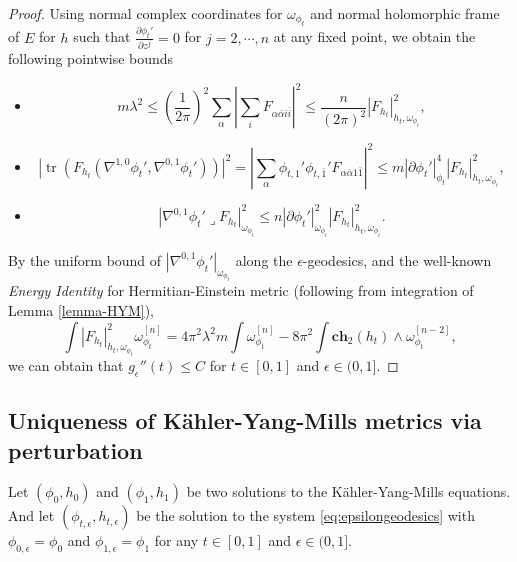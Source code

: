 \documentclass[10pt, letterpaper]{amsart}
\newcommand{\tr}{\operatorname{tr}}
\theoremstyle{plain}
\theoremstyle{definition}
\numberwithin{equation}{section}
\begin{document}
\begin{proof}
	Using normal complex coordinates for $\omega_{\phi_t}$ and normal holomorphic frame of $E$ for $h$ such that $\frac{\partial \phi_t'}{\partial z^j}=0$ for $j=2,\cdots, n$ at any fixed point, we obtain the following pointwise bounds
	\begin{itemize} 
	\item 
		\[
	m\lambda^2 
	\leq 
	\left( \frac{1}{2\pi} \right)^2\sum_\alpha \left|\sum_i F_{\alpha\bar \alpha i\bar i}\right|^2
	\leq 
	\frac{n}{\left(2\pi\right)^2}\left|F_{h_t}\right|_{h_t,\omega_{\phi_t}}^2, 
	\]
	\item 
	\[
	\left| \tr\left(
	F_{h_t}\left(\nabla^{1,0}\phi_t',\nabla^{0,1}\phi_t'\right)
	\right) \right|^2
	= 
	\left|\sum_\alpha \phi_{t,1}'\phi_{t,\bar 1}'F_{\alpha\bar\alpha 1\bar 1}\right|^2 
	\leq 
	m \left|\partial\phi_t'\right|_{\phi_t}^4\left|F_{h_t}\right|_{h_t,\omega_{\phi_t}}^2,
	\]
	\item 
	\[
	\left|\nabla^{0,1}\phi_t'\lrcorner  F_{h_t}\right|_{\omega_{\phi_t}}^2
	\leq 
	n\left|\partial\phi_t'\right|_{\omega_{\phi_t}}^2\left|F_{h_t}\right|_{h_t,\omega_{\phi_t}}^2. 
	\]
	\end{itemize}
By the uniform bound of $\left|\nabla^{0,1}\phi_t'\right|_{\omega_{\phi_t}}$ along the $\epsilon$-geodesics, and the well-known  \emph{Energy Identity} for Hermitian-Einstein metric (following from integration of Lemma \ref{lemma-HYM}), 
\begin{equation}
\int \left|F_{h_t}\right|^2_{h_t,\omega_{\phi_t}} \omega_{\phi_t}^{[n]}
= 
4\pi^2\lambda^2m \int\omega_{\phi_t}^{[n]}
- 
8\pi^2 \int \mathbf{ch}_2\left(h_t\right)\wedge \omega_{\phi_t}^{[n-2]}, 
\end{equation}
we can obtain that $g_\epsilon''(t)\leq C$ for $t\in [0,1]$ and $\epsilon\in (0,1]$. 	
\end{proof}

\subsection{Uniqueness of K\"ahler-Yang-Mills metrics via perturbation}

Let $\left(\phi_0,h_0\right)$ and $\left(\phi_1, h_1\right)$ be two solutions to the K\"ahler-Yang-Mills equations. And let $\left(\phi_{t,\epsilon},h_{t,\epsilon}\right)$ be the solution to the system \eqref{eq:epsilongeodesics} with $\phi_{0,\epsilon}=\phi_0$ and $\phi_{1,\epsilon}=\phi_1$ for any $t\in [0,1]$ and $\epsilon\in (0,1]$.
\end{document}
